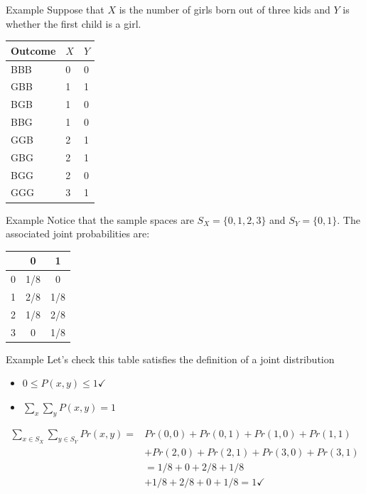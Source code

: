 \documentclass{beamer}
\begin{document}
\begin{frame}{Example}
	Suppose that $X$ is the number of girls born out of three kids and $Y$ is whether the first child is a girl.
	\begin{center}
		\begin{tabular}{|l|l|l|}
			\hline
			Outcome & $X$ & $Y$ \\
			\hline
			BBB     & 0   & 0   \\
			\hline
			GBB     & 1   & 1   \\
			\hline
			BGB     & 1   & 0   \\
			\hline
			BBG     & 1   & 0   \\
			\hline
			GGB     & 2   & 1   \\
			\hline
			GBG     & 2   & 1   \\
			\hline
			BGG     & 2   & 0   \\
			\hline
			GGG     & 3   & 1   \\
			\hline
		\end{tabular}
	\end{center}
\end{frame}

\begin{frame}{Example}
	Notice that the sample spaces are $S_X =\{0,1,2,3\}$ and $S_Y=\{0,1\}$. The associated joint probabilities are:
	\begin{center}
		\begin{tabular}{|c|c|c|}
			\hline
			\diagbox{$X$}{$Y$} & 0   & 1   \\
			\hline
			0                            & 1/8 & 0   \\
			\hline
			1                            & 2/8 & 1/8 \\
			\hline
			2                            & 1/8 & 2/8 \\
			\hline
			3                            & 0   & 1/8 \\
			\hline
		\end{tabular}
	\end{center}
\end{frame}

\begin{frame}{Example}
	Let's check this table satisfies the definition of a joint distribution
	\begin{itemize}
		\item $0 \leq P(x,y) \leq 1 \checkmark$
		\item $\sum_x \sum_y P(x,y)=1$
	\end{itemize}
	\begin{align*}
		\sum_{x\in S_X}\sum_{y\in S_Y}Pr(x,y) = & Pr(0,0) + Pr(0,1) + Pr(1,0) + Pr(1,1)   \\
		& + Pr(2,0) + Pr(2,1) + Pr(3,0) + Pr(3,1) \\
		& = 1/8 + 0 + 2/8 + 1/8 \\
		& +1/8 + 2/8 + 0 + 1/8 = 1 \checkmark     
	\end{align*}
\end{frame}
\end{document}
